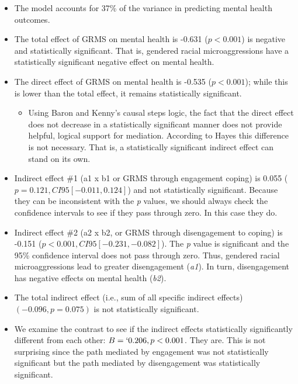 \documentclass[
  11pt,
]{book}
\providecommand{\tightlist}{%
  \setlength{\itemsep}{0pt}\setlength{\parskip}{0pt}}
\begin{document}
\begin{itemize}
\tightlist
\item
  The model accounts for 37\% of the variance in predicting mental health outcomes.
\item
  The total effect of GRMS on mental health is -0.631 (\(p < 0.001\)) is negative and statistically significant. That is, gendered racial microaggressions have a statistically significant negative effect on mental health.
\item
  The direct effect of GRMS on mental health is -0.535 (\(p < 0.001\)); while this is lower than the total effect, it remains statistically significant.

  \begin{itemize}
  \tightlist
  \item
    Using Baron and Kenny's \citeyearpar{baron_moderator-mediator_1986} causal steps logic, the fact that the direct effect does not decrease in a statistically significant manner does not provide helpful, logical support for mediation. According to Hayes \citeyearpar{hayes_more_2022} this difference is not necessary. That is, a statistically significant indirect effect can stand on its own.
  \end{itemize}
\item
  Indirect effect \#1 (a1 x b1 or GRMS through engagement coping) is 0.055 (\(p = 0.121, CI95[-0.011, 0.124]\)) and not statistically significant. Because they can be inconsistent with the \emph{p} values, we should always check the confidence intervals to see if they pass through zero. In this case they do.
\item
  Indirect effect \#2 (a2 x b2, or GRMS through disengagement to coping) is -0.151 (\(p < 0.001, CI95[-0.231, -0.082]\)). The \emph{p} value is significant and the 95\% confidence interval does not pass through zero. Thus, gendered racial microaggressions lead to greater disengagement (\emph{a1}). In turn, disengagement has negative effects on mental health (\emph{b2}).
\item
  The total indirect effect (i.e., sum of all specific indirect effects) \((-0.096, p = 0.075)\) is not statistically significant.
\item
  We examine the contrast to see if the indirect effects statistically significantly different from each other: \(B= `0.206, p < 0.001\). They are. This is not surprising since the path mediated by engagement was not statistically significant but the path mediated by disengagement was statistically significant.
\end{itemize}
\end{document}
